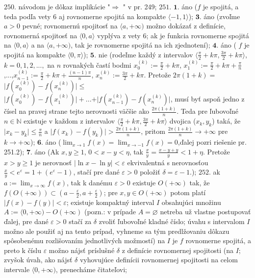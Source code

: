 $\boxed{250.}$ návodom je dôkaz implikácie "$\Rightarrow$ " v pr. 249;
$\boxed{251.}$ $\boldsymbol{1.}$ áno ($f$ je spojitá, a teda podľa vety 6 aj rovnomerne spojitá na kompakte $\langle -1,1 \rangle $);
$\boldsymbol{3.}$ áno (zvoľme $a>0$ pevné; rovnomernú spojitosť na $\langle a,+ \infty) $ možno dokázať z definície, rovnomerná spojitosť na $\langle 0,a \rangle $ vyplýva z vety 6; ak je funkcia rovnomerne spojitá na $\langle 0,a \rangle $ a na  $\langle a,+ \infty) $, tak je rovnomerne spojitá na ich zjednotení);
$\boldsymbol{4.}$ áno ( $f$ je spojitá na kompakte $\langle 0,\pi \rangle$);
$\boldsymbol{5.}$ nie (rodeľme každý z intervalov $\langle \frac{\pi}{2}+k \pi,\frac {3 \pi}{2}+ k\pi \rangle $, $k=0,1,2,...,$ na $n$ rovnakých častí bodmi $x_{0}^{(k)}:= \frac{\pi}{2}+k\pi$,  $x_{1}^{(k)}:= \frac{\pi}{2}+k\pi + \frac{\pi}{n}$,...,$x_{n-1}^{(k)}:= \frac{\pi}{2}+k\pi + \frac{(n-1)\pi}{n}$, $x_{n}^{(k)}:= \frac{3\pi}{2}+k\pi $. Pretože $2\pi({1+k})=$ $\vert f(x_{0}^{(k)})-f(x_{n}^{(k)})  \vert\leq $ $\vert f(x_{0}^{(k)})-f(x_{1}^{(k)})  \vert+...+\vert f(x_{n-1}^{(k)})-f(x_{n}^{(k)})  \vert $, musí byť aspoň jedno z čísel na pravej strane tejto  nerovnosti väčšie ako $\frac{2\pi(1+k)}{n} $. Teda pre ľubovoľné $n \in \mathbb{N}$ existuje v každom z intervalov $\langle \frac{\pi}{2}+k\pi,\frac{3\pi}{2}+k\pi\rangle $ dvojica ($x_{k},y_{k} $) taká, že $\vert x_{k}-y_{k}\vert \leq  \frac{\pi}{n}$ a $\vert f(x_{k})-f(y_{k})\vert > \frac{2\pi(1+k)}{n}$, pritom $\frac{2\pi(1+k)}{n} \rightarrow +\infty$ pre $k \rightarrow +\infty$);
$\boldsymbol{6.}$ áno ($\lim_{x \to 1}f(x)=\lim_{x \to -1}f(x)=0 $,ďalej pozri riešenie pr. 251.2);
$\boldsymbol{7.}$ áno (Ak $x,y\geq 1 $, $0< x-y < \eta  $, tak  $\frac{x}{y}=\frac{x-y+y}{y} < 1+\eta $.
Pretože $x>y\geq 1 $ je nerovnosť  $\vert\ln x - \ln y \vert < \varepsilon $ ekvivalentná s nerovnosťou $\frac{x}{y}< e^{\varepsilon}=1+(e^{\varepsilon}-1) $, stačí pre dané $\varepsilon>0$ položiť $\delta= \varepsilon-1 $.);
$\boxed{252.}$ ak $a:=\lim_{x \to \infty }f(x)$, tak k danému  $\varepsilon >0$ existuje $O(+\infty) $ tak, že $f(O(+\infty)) \subset (a-\frac{\varepsilon}{2}, a+\frac{\varepsilon}{2}) $; pre $ x,y \in O(+\infty)$ potom platí $\vert  f(x)-f(y) \vert < \varepsilon$; existuje kompaktný interval $I$ obsahujúci množinu $ A:= \langle 0,+\infty)-O(+\infty) $ (pozn.: v prípade $A=\varnothing$ netreba už vlastne postupovať ďalej, pre dané $\varepsilon>0$ stačí za $\delta$
 zvoliť ľubovoľné kladné číslo; úvahu s intervalom   $I$  možno ale použiť aj na tento prípad, vyhneme sa tým predlžovaniu dôkazu spôsobenému rozlišovaním jednotlivých možmostí) na  $I$ je  $f$ rovnomerne spojitá, a preto k číslu  $\varepsilon$ možno nájsť príslušné  $\delta$ z definície rovnomernej spojitosti (na  $I$; zvyšok úvah, ako nájsť  $\delta$ vyhovujúce definícii rovnomernej spojitosti na celom intervale  $\langle 0, +\infty)$, prenecháme čitateľovi; 
